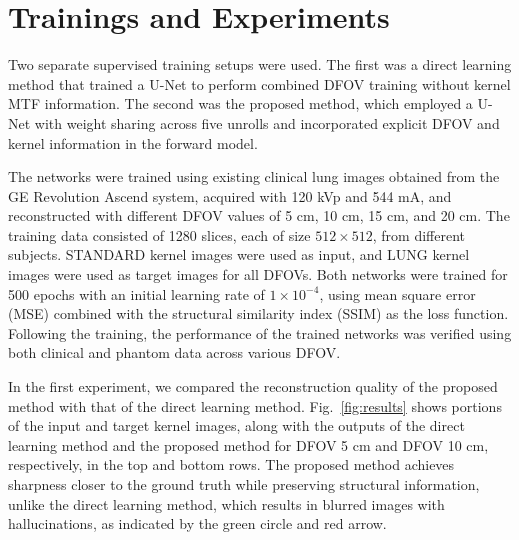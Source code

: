 \documentclass{article}
\begin{document}
\section{Trainings and Experiments}

Two separate supervised training setups were used. The first was a direct learning method that trained a U-Net to perform combined DFOV training without kernel MTF information. The second was the proposed method, which employed a U-Net with weight sharing across five unrolls and incorporated explicit DFOV and kernel information in the forward model. 

The networks were trained using existing clinical lung images obtained from the GE Revolution Ascend system, acquired with 120 kVp and 544 mA, and reconstructed with different DFOV values of 5 cm, 10 cm, 15 cm, and 20 cm. The training data consisted of 1280 slices, each of size $512 \times 512$, from different subjects. STANDARD kernel images were used as input, and LUNG kernel images were used as target images for all DFOVs. Both networks were trained for 500 epochs with an initial learning rate of $1 \times 10^{-4}$, using mean square error (MSE) combined with the structural similarity index (SSIM) as the loss function. Following the training, the performance of the trained networks was verified using both clinical and phantom data across various DFOV.

In the first experiment, we compared the reconstruction quality of the proposed method with that of the direct learning method. Fig.~\ref{fig:results} shows portions of the input and target kernel images, along with the outputs of the direct learning method and the proposed method for DFOV 5 cm and DFOV 10 cm, respectively, in the top and bottom rows. The proposed method achieves sharpness closer to the ground truth while preserving structural information, unlike the direct learning method, which results in blurred images with hallucinations, as indicated by the green circle and red arrow.
\end{document}
